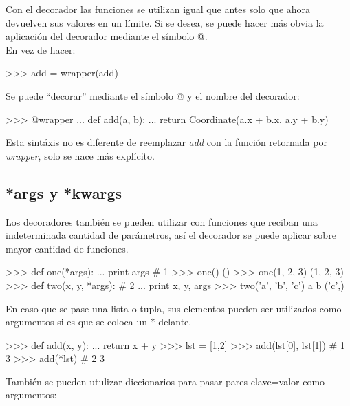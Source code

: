 Con el decorador las funciones se utilizan igual que antes solo que ahora devuelven sus valores en un límite. Si se desea, se puede hacer más obvia la aplicación del decorador mediante el símbolo @.\\

En vez de hacer:\\

\begin{pyglist} [language=python]
>>> add = wrapper(add)
\end{pyglist}

Se puede ``decorar'' mediante el símbolo @ y el nombre del decorador:\\

\begin{pyglist} [language=python]
>>> @wrapper
... def add(a, b):
...     return Coordinate(a.x + b.x, a.y + b.y)
\end{pyglist}

Esta sintáxis no es diferente de reemplazar \textit{add} con la función retornada por \textit{wrapper}, solo se hace más explícito.

\subsection{*args y *kwargs}

Los decoradores también se pueden utilizar con funciones que reciban una indeterminada cantidad de parámetros, así el decorador se puede aplicar sobre mayor cantidad de funciones.\\

\begin{pyglist} [language=python]
>>> def one(*args):
...     print args # 1
>>> one()
()
>>> one(1, 2, 3)
(1, 2, 3)
>>> def two(x, y, *args): # 2
...     print x, y, args
>>> two('a', 'b', 'c')
a b ('c',)
\end{pyglist}

En caso que se pase una lista o tupla, sus elementos pueden ser utilizados como argumentos si es que se coloca un * delante.\\

\begin{pyglist} [language=python]
>>> def add(x, y):
...     return x + y
>>> lst = [1,2]
>>> add(lst[0], lst[1]) # 1
3
>>> add(*lst) # 2
3
\end{pyglist}

También se pueden utulizar diccionarios para pasar pares clave=valor como argumentos:\\

